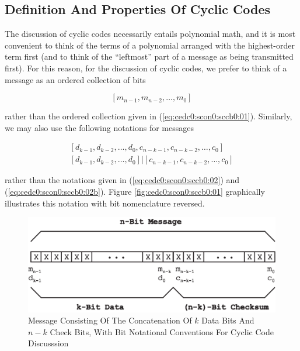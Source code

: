 \subsection{Definition And Properties Of Cyclic Codes}
\label{cedc0:scco0:sdpo0}

The discussion of cyclic codes necessarily entails polynomial math, and 
it is most convenient to think of the terms of a polynomial arranged with
the highest-order term first (and to think of the ``leftmost'' part of 
a message as being transmitted first).  For this reason, for the discussion of cyclic
codes, we prefer to think of a message as an ordered collection of bits

\begin{equation}
\label{eq:cedc0:scco0:sdpo0:a01}
[m_{n-1}, m_{n-2}, \ldots{}, m_{0}] 
\end{equation}

\noindent{}rather than the ordered collection given in (\ref{eq:cedc0:scon0:sccb0:01}).
Similarly, we may also use the following notations for messages

\begin{eqnarray}
\label{eq:cedc0:scco0:sdpo0:a02}
& [d_{k-1}, d_{k-2}, \ldots{}, d_{0}, c_{n-k-1}, c_{n-k-2}, \ldots{}, c_{0}]  & \\
\label{eq:cedc0:scco0:sdpo0:a02b}
& [d_{k-1}, d_{k-2}, \ldots{}, d_{0}] | [c_{n-k-1}, c_{n-k-2}, \ldots{}, c_{0}]  &
\end{eqnarray}

\noindent{}rather than the notations given in (\ref{eq:cedc0:scon0:sccb0:02}) 
and (\ref{eq:cedc0:scon0:sccb0:02b}).  Figure \ref{fig:cedc0:scon0:sccb0:01}
graphically illustrates this notation with bit nomenclature reversed.

\begin{figure}
\centering
\includegraphics[width=4.6in]{c_edc0/cword02.eps}
\caption{Message Consisting Of The Concatenation Of $k$ Data Bits And $n-k$
         Check Bits, With Bit Notational Conventions For Cyclic Code Discusssion}
\label{fig:cedc0:scon0:sdpo0:01}
\end{figure}

